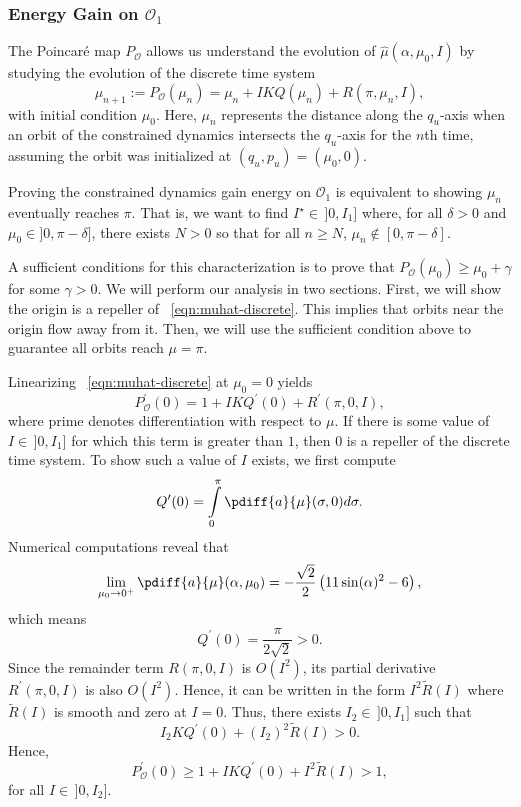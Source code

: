 \subsubsection*{Energy Gain on \(\mathcal{O}_1\)}

The Poincar\'{e} map \(P_\mathcal{O}\) allows us understand the evolution of
\(\hat{\mu}(\alpha,\mu_0,I)\) by studying the evolution of the discrete time
system
\begin{equation}\label{eqn:muhat-discrete}
        \mu_{n+1} := P_\mathcal{O}(\mu_n) 
        = \mu_n + I K Q(\mu_n) + R(\pi,\mu_n,I)
        ,
\end{equation}
with initial condition \(\mu_0\).
Here, \(\mu_n\) represents the distance along the
\(q_u\)-axis when an orbit of the constrained dynamics intersects the
\(q_u\)-axis for the \(n\)th time, assuming the orbit was initialized at
\((q_u,p_u) = (\mu_0,0)\).

Proving the constrained dynamics gain energy on \(\mathcal{O}_1\) is equivalent to
showing \(\mu_n\) eventually reaches \(\pi\).
That is, we want to find \(I^\star \in\, ]0, I_1]\) where, for all 
\(\delta > 0\) and \(\mu_0 \in ]0,\pi-\delta]\), there exists \(N > 0\) so that
for all \(n \geq N\), \(\mu_n \notin [0,\pi-\delta]\).

A sufficient conditions for this characterization is to prove that 
\(P_\mathcal{O}(\mu_0) \geq \mu_0 + \gamma\) for some \(\gamma > 0\).
We will perform our analysis in two sections.
First, we will show the origin is a repeller of ~\eqref{eqn:muhat-discrete}.
This implies that orbits near the origin flow away from it.
Then, we will use the sufficient condition above to guarantee all orbits reach
\(\mu = \pi\).

Linearizing ~\eqref{eqn:muhat-discrete} at \(\mu_0 = 0\) yields
\[
    P^\prime_\mathcal{O}(0) = 1 + I K Q^\prime(0) +
    R^\prime(\pi,0,I)
    ,
\]
where prime denotes differentiation with respect to \(\mu\).
If there is some value of \(I \in \,]0,I_1]\) for which this term is greater than
\(1\), then \(0\) is a repeller of the discrete time system.
To show such a value of \(I\) exists, we first compute 
\[
    Q^\prime(0) = \int \limits_0^\pi \pdiff{a}{\mu}(\sigma,0) d\sigma
    .
\]
Numerical computations reveal that 
\[
    \lim \limits_{\mu_0 \to 0^+}
    \pdiff{a}{\mu}(\alpha,\mu_0) 
    = -\frac{\sqrt{2}}{2} \left(11\sin(\alpha)^2 - 6\right)
    ,
\]
which means 
\[
    Q^\prime(0)  = \frac{\pi}{2\sqrt{2}} > 0
    .
\]
Since the remainder term \(R(\pi,0,I)\) is \(O(I^2)\), 
its partial derivative \(R^\prime(\pi,0,I)\) is also \(O(I^2)\).
Hence, it can be written in the form
\(I^2 \tilde{R}(I)\) where \(\tilde{R}(I)\) is smooth and
zero at \(I = 0\).
Thus, there exists \(I_2 \in \,]0,I_1]\) such that
\[
    I_2 K Q^\prime(0) + (I_2)^2 \tilde{R}(I) > 0
    .
\]
Hence,
\[
    P^\prime_\mathcal{O}(0) \geq 1 + IKQ^\prime(0) + I^2 \tilde{R}(I) 
    > 1
    ,
\] 
for all \(I \in \,]0, I_2]\).

